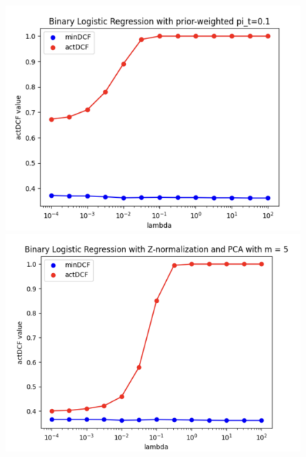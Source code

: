 \documentclass{article}
\begin{document}
\begin{figure}[H]
\begin{minipage}{.23\textwidth}
            \includegraphics[width=\linewidth]{./img/LLR_W3.png}
        \end{minipage}
        \begin{minipage}{.23\textwidth}
            \centering
            \includegraphics[width=\linewidth]{./img/LLR_Z2.png}
        \end{minipage}
        \begin{minipage}{.23\textwidth}
            \centering

\end{minipage}
\end{figure}
\end{document}
